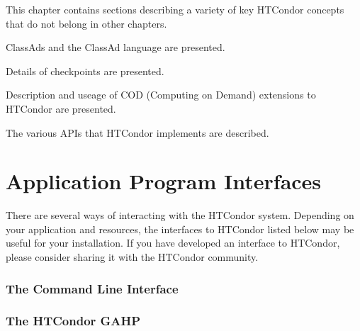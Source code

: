 This chapter contains sections describing a variety of key
HTCondor concepts that do not belong in other chapters.

ClassAds and the ClassAd language are presented.

Details of checkpoints are presented.

Description and useage of COD (Computing on Demand) extensions to HTCondor
are presented.

The various APIs that HTCondor implements are described.







\chapter{Application Program Interfaces}
\label{sec:Misc-APIs}

There are several ways of interacting with the HTCondor system.  Depending on
your application and resources, the interfaces to HTCondor listed below may be
useful for your installation. If you have developed an interface to HTCondor,
please consider sharing it with the HTCondor community.






\subsection{\label{API-commandline} The Command Line Interface}
\Todo

\subsection{\label{API-GAHP} The HTCondor GAHP}
\Todo




